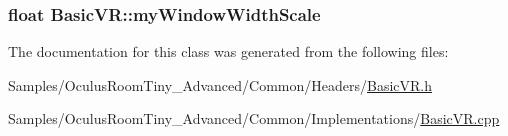 \subsubsection[{\texorpdfstring{my\+Window\+Width\+Scale}{myWindowWidthScale}}]{\setlength{\rightskip}{0pt plus 5cm}float Basic\+V\+R\+::my\+Window\+Width\+Scale\hspace{0.3cm}{\ttfamily [protected]}}\hypertarget{class_basic_v_r_ac6a774a1d2c2a6e49b70920a77363c83}{}\label{class_basic_v_r_ac6a774a1d2c2a6e49b70920a77363c83}


The documentation for this class was generated from the following files\+:\begin{DoxyCompactItemize}
\item 
Samples/\+Oculus\+Room\+Tiny\+\_\+\+Advanced/\+Common/\+Headers/\hyperlink{_basic_v_r_8h}{Basic\+V\+R.\+h}\item 
Samples/\+Oculus\+Room\+Tiny\+\_\+\+Advanced/\+Common/\+Implementations/\hyperlink{_basic_v_r_8cpp}{Basic\+V\+R.\+cpp}\end{DoxyCompactItemize}
